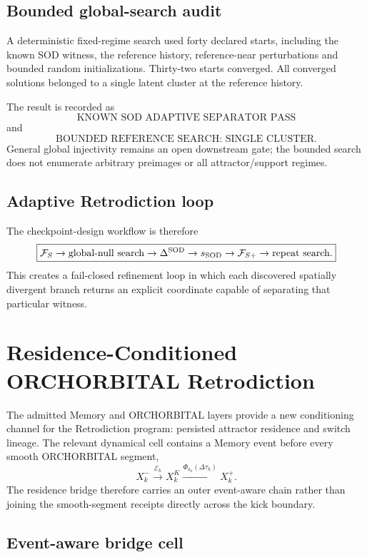 \documentclass[11pt]{book}
\begin{document}
\section{Bounded global-search audit}

A deterministic fixed-regime search used forty declared starts, including the known SOD witness, the reference history, reference-near perturbations and bounded random initializations. Thirty-two starts converged. All converged solutions belonged to a single latent cluster at the reference history.

The result is recorded as
\[
\boxed{\text{KNOWN SOD ADAPTIVE SEPARATOR PASS}}
\]
and
\[
\boxed{\text{BOUNDED REFERENCE SEARCH: SINGLE CLUSTER}}.
\]
General global injectivity remains an open downstream gate; the bounded search does not enumerate arbitrary preimages or all attractor/support regimes.

\section{Adaptive Retrodiction loop}

The checkpoint-design workflow is therefore
\[
\boxed{
\mathcal F_S
\rightarrow \text{global-null search}
\rightarrow \Delta^{\rm SOD}
\rightarrow s_{\rm SOD}
\rightarrow \mathcal F_{S+}
\rightarrow \text{repeat search}.
}
\]
This creates a fail-closed refinement loop in which each discovered spatially divergent branch returns an explicit coordinate capable of separating that particular witness.

\chapter{Residence-Conditioned ORCHORBITAL Retrodiction}

The admitted Memory and ORCHORBITAL layers provide a new conditioning channel for the Retrodiction program: persisted attractor residence and switch lineage. The relevant dynamical cell contains a Memory event before every smooth ORCHORBITAL segment,
\[
X_k^-
\xrightarrow{\mathcal E_k}
X_k^{K}
\xrightarrow{\Phi_{a_k}(\Delta\tau_k)}
X_k^+.
\]
The residence bridge therefore carries an outer event-aware chain rather than joining the smooth-segment receipts directly across the kick boundary.

\section{Event-aware bridge cell}
\end{document}
